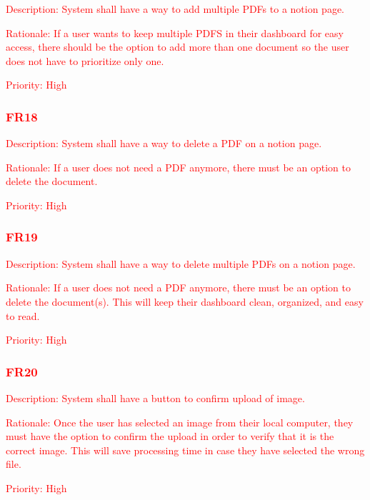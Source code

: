 \documentclass[12pt, titlepage]{article}
\begin{document}
\begin{description}
	\item \textcolor{red}{Description: System shall have a way to add multiple PDFs to a notion page.}
	\item \textcolor{red}{Rationale: If a user wants to keep multiple PDFS in their dashboard for easy access, there should be the option to add more than one document so the user does not have to prioritize only one. }
	\item \textcolor{red}{Priority: High}
\end{description}

\subsubsection{\textcolor{red}{FR18}}

\begin{description}
	\item \textcolor{red}{Description: System shall have a way to delete a PDF on a notion page.}
	\item \textcolor{red}{Rationale: If a user does not need a PDF anymore, there must be an option to delete the document.}
	\item \textcolor{red}{Priority: High}
\end{description}

\subsubsection{\textcolor{red}{FR19}}

\begin{description}
	\item \textcolor{red}{Description: System shall have a way to delete multiple PDFs on a notion page.}
	\item \textcolor{red}{Rationale: If a user does not need a PDF anymore, there must be an option to delete the document(s). This will keep their dashboard clean, organized, and easy to read.}
	\item \textcolor{red}{Priority: High}
\end{description}

\subsubsection{\textcolor{red}{FR20}}

\begin{description}
	\item \textcolor{red}{Description: System shall have a button to confirm upload of image.}
	\item \textcolor{red}{Rationale: Once the user has selected an image from their local computer, they must have the option to confirm the upload in order to verify that it is the correct image. This will save processing time in case they have selected the wrong file.}
	\item \textcolor{red}{Priority: High}
\end{description}
\end{document}
